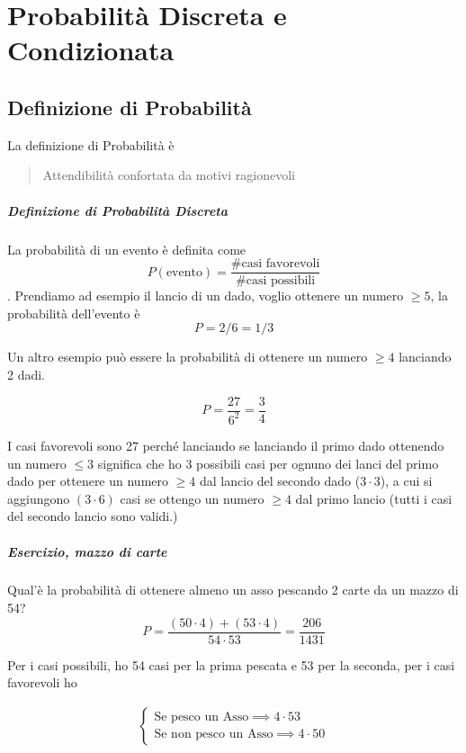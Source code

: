 \chapter{Probabilità Discreta e Condizionata}

\section{Definizione di Probabilità}

La definizione di Probabilità è

\begin{quote}
	Attendibilità confortata da motivi ragionevoli
\end{quote}

\paragraph{Definizione di Probabilità Discreta}

La probabilità di un evento è definita come \[ P(\text{evento}) = \dfrac{\text{\# casi favorevoli}}{\text{\# casi possibili}}  \]. Prendiamo ad esempio il lancio di un dado, voglio ottenere un numero $ \geq 5 $, la probabilità dell'evento è
\[ P = 2/6 = 1/3  \]

Un altro esempio può essere la probabilità di ottenere un numero $ \geq 4 $ lanciando 2 dadi.

\[ P = \dfrac{27}{6^2} = \dfrac{3}{4} \]

I casi favorevoli sono 27 perché lanciando se lanciando il primo dado ottenendo un numero $ \leq 3 $ significa che ho 3 possibili casi per ognuno dei lanci del primo dado per ottenere un numero $ \geq 4 $ dal lancio del secondo dado ($ 3 \cdot 3 $), a cui si aggiungono $ (3 \cdot 6) $ casi se ottengo un numero $ \geq 4 $ dal primo lancio (tutti i casi del secondo lancio sono validi.)

\paragraph{Esercizio, mazzo di carte}

Qual'è la probabilità di ottenere almeno un asso pescando 2 carte da un mazzo di 54?
\[ P = \dfrac{(50 \cdot 4) + (53 \cdot 4)}{54 \cdot 53} = \dfrac{206}{1431}\]

Per i casi possibili, ho 54 casi per la prima pescata e 53 per la seconda, per i casi favorevoli ho

\begin{align}
	\begin{cases}
		\text{Se pesco un Asso} \implies 4 \cdot 53 \\
		\text{Se non pesco un Asso} \implies 4 \cdot 50
	\end{cases}
\end{align}

